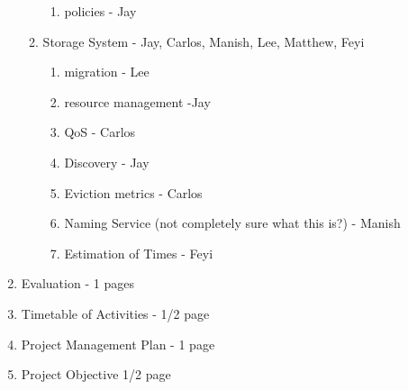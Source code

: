 \begin{enumerate}
\begin{enumerate}
\begin{enumerate}
            \item policies - Jay
          \end{enumerate}
      \item Storage System - Jay, Carlos, Manish, Lee, Matthew, Feyi
      \begin{enumerate}
         \item migration - Lee
         \item resource management -Jay
         \item QoS - Carlos 
         \item Discovery - Jay
         \item Eviction metrics - Carlos
         \item Naming Service (not completely sure what this is?) - Manish
         \item Estimation of Times - Feyi
      \end{enumerate}
    \end{enumerate}
\item Evaluation - 1 pages
\item Timetable of Activities - 1/2 page
\item Project Management Plan - 1 page
\item Project Objective  1/2 page
\end{enumerate}

\vfill
